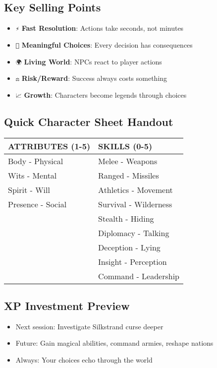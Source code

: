 \documentclass[12pt]{article}
\newcommand{\dice}[1]{\texttt{#1}}
\begin{document}
\subsection*{Key Selling Points}
\begin{itemize}
\item \dice{⚡} \textbf{Fast Resolution}: Actions take seconds, not minutes
\item \dice{🎲} \textbf{Meaningful Choices}: Every decision has consequences  
\item \dice{🌍} \textbf{Living World}: NPCs react to player actions
\item \dice{⚖️} \textbf{Risk/Reward}: Success always costs something
\item \dice{📈} \textbf{Growth}: Characters become legends through choices
\end{itemize}

\subsection*{Quick Character Sheet Handout}
\begin{center}
\begin{tabular}{|l|l|}
\hline
\textbf{ATTRIBUTES (1-5)} & \textbf{SKILLS (0-5)} \\
\hline
Body - Physical & Melee - Weapons \\
Wits - Mental & Ranged - Missiles \\  
Spirit - Will & Athletics - Movement \\
Presence - Social & Survival - Wilderness \\
& Stealth - Hiding \\
& Diplomacy - Talking \\
& Deception - Lying \\
& Insight - Perception \\
& Command - Leadership \\
\hline
\end{tabular}
\end{center}

\subsection*{XP Investment Preview}
\begin{itemize}
\item Next session: Investigate Silkstrand curse deeper
\item Future: Gain magical abilities, command armies, reshape nations
\item Always: Your choices echo through the world
\end{itemize}
\end{document}
